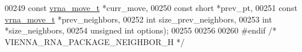 \begin{DoxyCode}
00249                           \textcolor{keyword}{const} \mbox{\hyperlink{group__neighbors_structvrna__move__s}{vrna\_move\_t}}           *curr\_move,
00250                           \textcolor{keyword}{const} \textcolor{keywordtype}{short}                 *prev\_pt,
00251                           \textcolor{keyword}{const} \mbox{\hyperlink{group__neighbors_structvrna__move__s}{vrna\_move\_t}}           *prev\_neighbors,
00252                           \textcolor{keywordtype}{int}                         size\_prev\_neighbors,
00253                           \textcolor{keywordtype}{int}                         *size\_neighbors,
00254                           \textcolor{keywordtype}{unsigned} \textcolor{keywordtype}{int}                options);
00255 
00256 
00260 \textcolor{preprocessor}{#endif }\textcolor{comment}{/* VIENNA\_RNA\_PACKAGE\_NEIGHBOR\_H */}\textcolor{preprocessor}{}
\end{DoxyCode}
